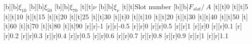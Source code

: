 %    
%
%
\begin{psfrags}%
\psfragscanon%
%
[b][b]{{\tiny $\xi_{10}$}}%
[b][b]{{\tiny $\xi_{50}$}}%
[b][b]{{\tiny $\xi_{70}$}}%
[t][t]{{\tiny $\nu$}}%
[b][b]{{\tiny $\xi_{\nu}$}}%
[t][t]{{\tiny Slot number}}%
[b][b]{{\tiny $F_{slot}/\SI{}{A}$}}%
%
[t][t]{{\tiny 0}}%
[t][t]{{\tiny 5}}%
[t][t]{{\tiny 10}}%
[t][t]{{\tiny 15}}%
[t][t]{{\tiny 20}}%
[t][t]{{\tiny 25}}%
[t][t]{{\tiny 30}}%
[t][t]{{\tiny 0}}%
[t][t]{{\tiny 10}}%
[t][t]{{\tiny 20}}%
[t][t]{{\tiny 30}}%
[t][t]{{\tiny 40}}%
[t][t]{{\tiny 50}}%
[t][t]{{\tiny 60}}%
[t][t]{{\tiny 70}}%
[t][t]{{\tiny 80}}%
[t][t]{{\tiny 90}}%
%
[r][r]{{\tiny -1}}%
[r][r]{{\tiny -0.5}}%
[r][r]{{\tiny 0}}%
[r][r]{{\tiny 0.5}}%
[r][r]{{\tiny 1}}%
[r][r]{{\tiny 0}}%
[r][r]{{\tiny 0.1}}%
[r][r]{{\tiny 0.2}}%
[r][r]{{\tiny 0.3}}%
[r][r]{{\tiny 0.4}}%
[r][r]{{\tiny 0.5}}%
[r][r]{{\tiny 0.6}}%
[r][r]{{\tiny 0.7}}%
[r][r]{{\tiny 0.8}}%
[r][r]{{\tiny 0.9}}%
[r][r]{{\tiny 1}}%
[r][r]{{\tiny 1.1}}%
%

%
\end{psfrags}%
%
